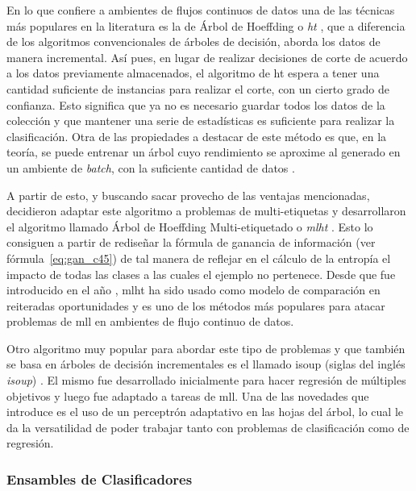 En lo que confiere a ambientes de flujos continuos de datos una de las técnicas
más populares en la literatura es la de Árbol de Hoeffding o
\textit{\acrfull{ht}} \cite{domingos_mining_2002}, que a diferencia de los
algoritmos convencionales de árboles de decisión, aborda los datos de manera
incremental. Así pues, en lugar de realizar decisiones de corte de acuerdo a los
datos previamente almacenados, el algoritmo de \acrshort{ht} espera a tener una
cantidad suficiente de instancias para realizar el corte, con un cierto grado de
confianza. Esto significa que ya no es necesario guardar todos los datos de la
colección y que mantener una serie de estadísticas es suficiente para realizar
la clasificación. Otra de las propiedades a destacar de este método es que, en
la teoría, se puede entrenar un árbol cuyo rendimiento se aproxime al generado
en un ambiente de \textit{batch}, con la suficiente cantidad de datos
\cite{bifet_machine_2018}.

A partir de esto, y buscando sacar provecho de las ventajas mencionadas,
\citeauthor{read_scalable_2012} decidieron adaptar este algoritmo a problemas de
multi-etiquetas y desarrollaron el algoritmo llamado Árbol de Hoeffding
Multi-etiquetado o \textit{\acrfull{mlht}} \cite{read_scalable_2012}. Esto lo
consiguen a partir de rediseñar la fórmula de ganancia de información (ver
fórmula~\ref{eq:gan_c45}) de tal manera de reflejar en el cálculo de la entropía
el impacto de todas las clases a las cuales el ejemplo no pertenece. Desde que
fue introducido en el año \citeyear{read_scalable_2012}, \acrshort{mlht} ha sido
usado como modelo de comparación en reiteradas oportunidades
\cite{sousa_multi-label_2018} y es uno de los métodos más populares para atacar
problemas de \acrshort{mll} en ambientes de flujo continuo de datos.

Otro algoritmo muy popular para abordar este tipo de problemas y que también se
basa en árboles de decisión incrementales es el llamado \acrshort{isoup} (siglas
del inglés \textit{\acrlong{isoup}}) \cite{osojnik_multi-label_2017}. El mismo
fue desarrollado inicialmente para hacer regresión de múltiples objetivos y
luego fue adaptado a tareas de \acrshort{mll}. Una de las novedades que
introduce es el uso de un perceptrón adaptativo en las hojas del árbol, lo cual
le da la versatilidad de poder trabajar tanto con problemas de clasificación
como de regresión.

\subsubsection{Ensambles de Clasificadores}
\label{ensambles_mll}

